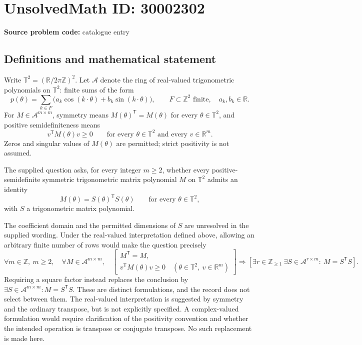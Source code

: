 \documentclass[11pt]{article}
\newcommand{\Z}{\mathbb{Z}}
\newcommand{\R}{\mathbb{R}}
\begin{document}
\section*{UnsolvedMath ID: 30002302}
\textbf{Source problem code:} catalogue entry
\subsection{Definitions and mathematical statement}
Write \(\mathbb T^2=(\R/2\pi\Z)^2\). Let \(\mathcal A\) denote the ring of real-valued trigonometric polynomials on \(\mathbb T^2\): finite sums of the form
\[
p(\theta)=\sum_{k\in F}\bigl(a_k\cos(k\cdot\theta)+b_k\sin(k\cdot\theta)\bigr),\qquad F\subset\Z^2\text{ finite},\quad a_k,b_k\in\R.
\]
For \(M\in\mathcal A^{m\times m}\), symmetry means \(M(\theta)^{\mathsf T}=M(\theta)\) for every \(\theta\in\mathbb T^2\), and positive semidefiniteness means
\[
v^{\mathsf T}M(\theta)v\geq0\qquad\text{for every }\theta\in\mathbb T^2\text{ and every }v\in\R^m.
\]
Zeros and singular values of \(M(\theta)\) are permitted; strict positivity is not assumed.

The supplied question asks, for every integer \(m\geq2\), whether every positive-semidefinite symmetric trigonometric matrix polynomial \(M\) on \(\mathbb T^2\) admits an identity
\[
M(\theta)=S(\theta)^{\mathsf T}S(\theta)\qquad\text{for every }\theta\in\mathbb T^2,
\]
with \(S\) a trigonometric matrix polynomial.

The coefficient domain and the permitted dimensions of \(S\) are unresolved in the supplied wording. Under the real-valued interpretation defined above, allowing an arbitrary finite number of rows would make the question precisely
\[
\forall m\in\Z,\ m\geq2,\quad
\forall M\in\mathcal A^{m\times m},\quad
\left[\begin{gathered}M^{\mathsf T}=M,\\
v^{\mathsf T}M(\theta)v\geq0\quad(\theta\in\mathbb T^2,\ v\in\R^m)
\end{gathered}\right]
\Longrightarrow
\left[\exists r\in\Z_{\geq1}\ \exists S\in\mathcal A^{r\times m}:\ M=S^{\mathsf T}S\right].
\]
Requiring a square factor instead replaces the conclusion by \(\exists S\in\mathcal A^{m\times m}:M=S^{\mathsf T}S\). These are distinct formulations, and the record does not select between them. The real-valued interpretation is suggested by symmetry and the ordinary transpose, but is not explicitly specified. A complex-valued formulation would require clarification of the positivity convention and whether the intended operation is transpose or conjugate transpose. No such replacement is made here.
\end{document}
